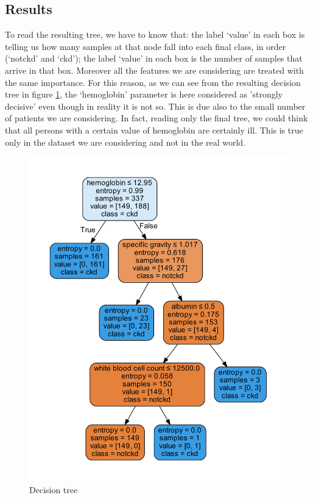 \documentclass[a4paper,12pt,oneside,titlepage]{article}
\begin{document}
	\subsection{Results}
	To read the resulting tree, we have to know that: the label ‘value’ in each box is telling us how many samples at that node fall into each final class, in order (‘notckd’ and ‘ckd’); the label ‘value’ in each box is the number of samples that arrive in that box. Moreover all the features we are considering are treated with the same importance. For this reason, as we can see from the resulting decision tree in figure \ref{albero}, the ‘hemoglobin’ parameter is here considered as 'strongly decisive' even though in reality it is not so. This is due also to the small number of patients we are considering. In fact, reading only the final tree, we could think that all persons with a certain value of hemoglobin are certainly ill. This is true only in the dataset we are considering and not in the real world.
	\begin{figure}[ht]
		\centering
		\includegraphics[scale=0.55]{tree.pdf}
		
		\caption{ Decision tree}
		\label{albero}
	\end{figure}
	
\end{document}
